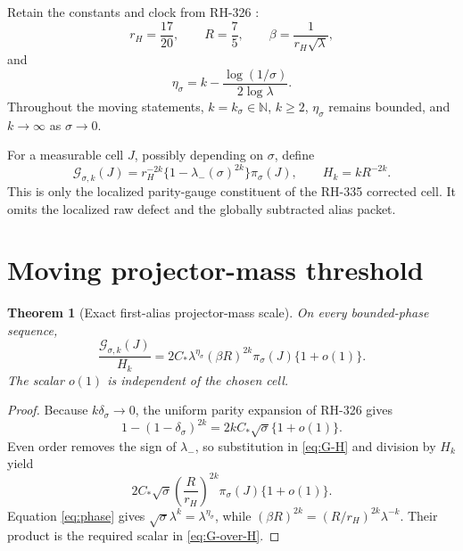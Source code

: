 \documentclass[11pt]{article}
\newtheorem{theorem}{Theorem}[section]
\theoremstyle{remark}
\newcommand{\cG}{\mathcal G}
\begin{document}
Retain the constants and clock from RH-326
\citep{WangFirstAlias2026}:
\begin{equation}\label{eq:constants}
 r_H=\frac{17}{20},\qquad R=\frac75,\qquad
 \beta=\frac1{r_H\sqrt\lambda},
\end{equation}
and
\begin{equation}\label{eq:phase}
 \eta_\sigma
 =k-\frac{\log(1/\sigma)}{2\log\lambda}.
\end{equation}
Throughout the moving statements, $k=k_\sigma\in\mathbb N$, $k\ge2$,
$\eta_\sigma$ remains bounded, and $k\to\infty$ as $\sigma\to0$.

For a measurable cell $J$, possibly depending on $\sigma$, define
\begin{equation}\label{eq:G-H}
 \cG_{\sigma,k}(J)
 =r_H^{-2k}\{1-\lambda_-(\sigma)^{2k}\}\pi_\sigma(J),
 \qquad H_k=kR^{-2k}.
\end{equation}
This is only the localized parity-gauge constituent of the RH-335 corrected
cell.  It omits the localized raw defect and the globally subtracted alias
packet.

\section{Moving projector-mass threshold}

\begin{theorem}[Exact first-alias projector-mass scale]
\label{thm:moving-scale}
On every bounded-phase sequence,
\begin{equation}\label{eq:G-over-H}
 \boxed{
 \frac{\cG_{\sigma,k}(J)}{H_k}
 =2C_*\lambda^{\eta_\sigma}(\beta R)^{2k}
 \pi_\sigma(J)\{1+o(1)\}.}
\end{equation}
The scalar $o(1)$ is independent of the chosen cell.
\end{theorem}

\begin{proof}
Because $k\delta_\sigma\to0$, the uniform parity expansion of RH-326 gives
\begin{equation}\label{eq:parity-expansion}
 1-(1-\delta_\sigma)^{2k}
 =2kC_*\sqrt\sigma\{1+o(1)\}.
\end{equation}
Even order removes the sign of $\lambda_-$, so substitution in
\eqref{eq:G-H} and division by $H_k$ yield
\[
 2C_*\sqrt\sigma\left(\frac{R}{r_H}\right)^{2k}
 \pi_\sigma(J)\{1+o(1)\}.
\]
Equation \eqref{eq:phase} gives
$\sqrt\sigma\lambda^k=\lambda^{\eta_\sigma}$, while
$(\beta R)^{2k}=(R/r_H)^{2k}\lambda^{-k}$.  Their product is the required
scalar in \eqref{eq:G-over-H}.
\end{proof}
\end{document}
